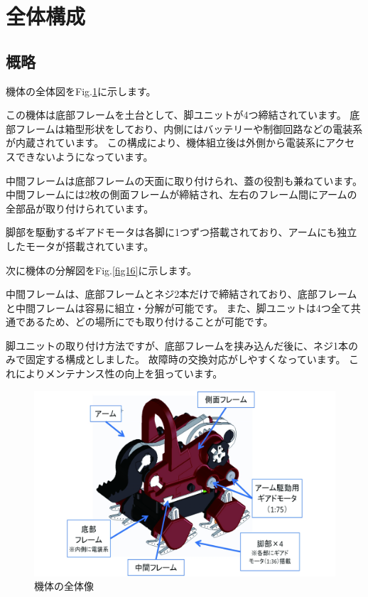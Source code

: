 \section{全体構成}\label{ux5168ux4f53ux69cbux6210}

\subsection{概略}\label{ux6982ux7565}

機体の全体図をFig.\ref{fig15}に示します。

この機体は底部フレームを土台として、脚ユニットが4つ締結されています。
底部フレームは箱型形状をしており、内側にはバッテリーや制御回路などの電装系が内蔵されています。
この構成により、機体組立後は外側から電装系にアクセスできないようになっています。

中間フレームは底部フレームの天面に取り付けられ、蓋の役割も兼ねています。
中間フレームには2枚の側面フレームが締結され、左右のフレーム間にアームの全部品が取り付けられています。

脚部を駆動するギアドモータは各脚に1つずつ搭載されており、アームにも独立したモータが搭載されています。

次に機体の分解図をFig.\ref{fig16}に示します。

中間フレームは、底部フレームとネジ2本だけで締結されており、底部フレームと中間フレームは容易に組立・分解が可能です。
また、脚ユニットは4つ全て共通であるため、どの場所にでも取り付けることが可能です。

脚ユニットの取り付け方法ですが、底部フレームを挟み込んだ後に、ネジ1本のみで固定する構成としました。
故障時の交換対応がしやすくなっています。
これによりメンテナンス性の向上を狙っています。

\begin{figure}[htbp]
\centering
\includegraphics[width=400pt]{fig/fig15_cmyk.jpg}
\caption{機体の全体像}
\label{fig15}
\end{figure}

